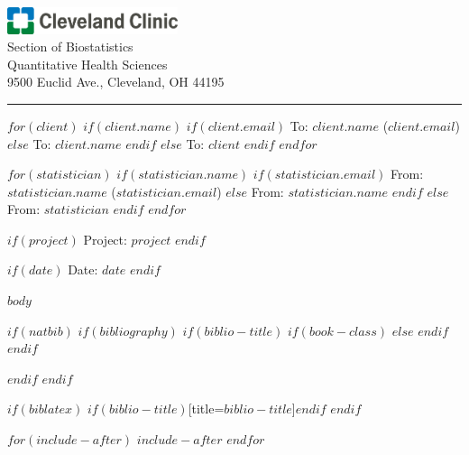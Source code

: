 \documentclass[10pt,$if(lang)$$babel-lang$,$endif$$if(papersize)$$papersize$,$endif$$for(classoption)$$classoption$$sep$,$endfor$]{article}
\newcommand\makeheaderblock{
\begin{minipage}{0.5\textwidth}
\raggedright
$for(client)$
  $if(client.name)$
    $if(client.email)$
    To: $client.name$ ($client.email$)
    $else$
    To: $client.name$
    $endif$
  $else$
  To: $client$
  $endif$
$endfor$

$for(statistician)$
  $if(statistician.name)$
    $if(statistician.email)$
    From: $statistician.name$ ($statistician.email$)
    $else$
    From: $statistician.name$
    $endif$
  $else$
  From: $statistician$
  $endif$
$endfor$

$if(project)$
Project: $project$
$endif$

$if(date)$
Date: $date$
$endif$

\end{minipage}
}
\begin{document}

\color{ccfblack}
\hfill
\begin{minipage}{0.5\textwidth}
\raggedleft
\includegraphics[width=5cm]{CC.png} \\
Section of Biostatistics\\
Quantitative Health Sciences\\
9500 Euclid Ave., Cleveland, OH 44195\\
\end{minipage}
\hrule

\setlength{\tabcolsep}{1em}
\renewcommand{\arraystretch}{1.5}

\vspace{0.25cm}

\makeheaderblock

\vspace{0.25cm}

$body$

$if(natbib)$
$if(bibliography)$
$if(biblio-title)$
$if(book-class)$
\renewcommand\bibname{$biblio-title$}
$else$
\renewcommand\refname{$biblio-title$}
$endif$
$endif$


$endif$
$endif$

$if(biblatex)$
\printbibliography$if(biblio-title)$[title=$biblio-title$]$endif$
$endif$

$for(include-after)$
$include-after$
$endfor$
\end{document}
